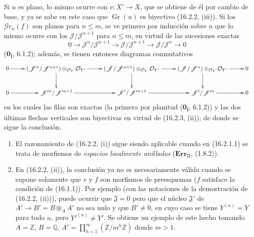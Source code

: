 Si $u$ es plano, lo mismo ocurre con $v:X'\to X$, que se obtiene de él por
cambio de base, y ya se sabe en este caso que $\operatorname{Gr}(u)$ es
biyectivo (16.2.2, (iii)). Si los $\mathscr{G}r_n(f)$ son planos para
$n\leq m$, se ve primero por inducción sobre $n$ que lo mismo ocurre con los
$\mathscr J/\mathscr J^{n+1}$ para $n\leq m$, en virtud de las sucesiones exactas
\[
  0\longrightarrow\mathscr J^n/\mathscr J^{n+1}
  \longrightarrow\mathscr J/\mathscr J^{n+1}
  \longrightarrow\mathscr J/\mathscr J^n
  \longrightarrow 0
\]
(\textbf{0}\textsubscript{I}, 6.1.2); además, se tienen entonces diagramas conmutativos
\[
  \xymatrix{
    0 \ar[r] &
    (\mathscr J^n/\mathscr J^{n+1})
      \otimes_{\mathcal{O}_Y}\mathcal{O}_{Y'}
      \ar[r]\ar[d] &
    (\mathscr J/\mathscr J^{n+1})
      \otimes_{\mathcal{O}_Y}\mathcal{O}_{Y'}
      \ar[r]\ar[d] &
    (\mathscr J/\mathscr J^n)
      \otimes_{\mathcal{O}_Y}\mathcal{O}_{Y'}
      \ar[r]\ar[d] & 0 \\
    0 \ar[r] &
    \mathscr J'^n/\mathscr J'^{n+1}
      \ar[r] &
    \mathscr J'/\mathscr J'^{n+1}
      \ar[r] &
    \mathscr J'/\mathscr J'^n
      \ar[r] & 0
  }
\]
en los cuales las filas son exactas (la primera por planitud
(\textbf{0}\textsubscript{I}, 6.1.2)) y las dos últimas flechas verticales son
biyectivas en virtud de (16.2.3, (ii)); de donde se sigue la conclusión.

\begin{remarks}[16.2.5]
\label{IV.16.2.5}
\begin{enumerate}
\item[(i)] El razonamiento de (16.2.2, (i)) sigue siendo aplicable cuando en
(16.2.1.1) se trata de morfismos de \emph{espacios localmente anillados}
($\mathbf{Err}_{\mathrm{II}}$, (1.8.2)).
\item[(ii)] En (16.2.2, (ii)), la conclusión ya no es necesariamente válida
cuando se supone solamente que $v$ y $f$ son morfismos de preesquemas
($f$ satisface la condición de (16.1.1)). Por ejemplo (con las notaciones de la
demostración de (16.2.2, (ii))), puede ocurrir que $\mathfrak J=0$ pero que
el núcleo $\mathfrak J'$ de $A'\to B'=B\otimes_A A'$ no sea nulo y que
$B'\neq 0$, en cuyo caso se tiene $Y^{(n)}=Y$ para todo $n$, pero
$Y'^{(n)}\neq Y'$. Se obtiene un ejemplo de este hecho tomando
$A=\mathbb{Z}$, $B=\mathbb{Q}$,
$A'=\prod_{h=1}^{\infty}(\mathbb{Z}/m^h\mathbb{Z})$ donde $m>1$.
\end{enumerate}
\end{remarks}

